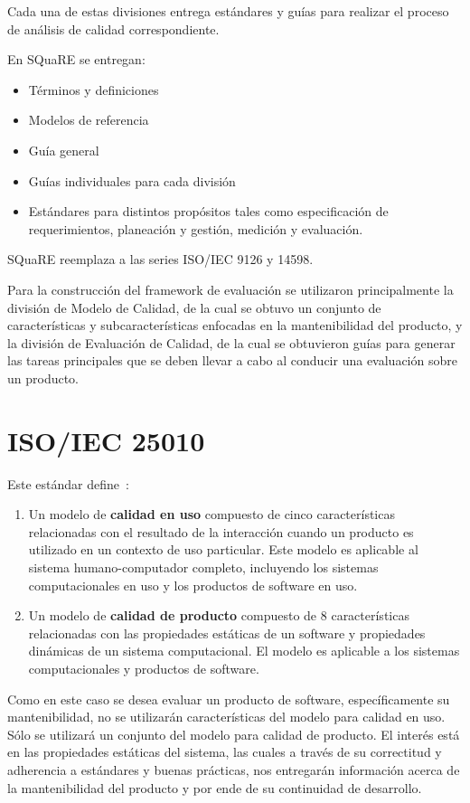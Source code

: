 Cada una de estas divisiones entrega estándares y guías para realizar
el proceso de análisis de calidad correspondiente.

En SQuaRE se entregan:
\begin{itemize}
    \item Términos y definiciones
    \item Modelos de referencia
    \item Guía general
    \item Guías individuales para cada división
    \item Estándares para distintos propósitos tales como especificación de requerimientos,
    planeación y gestión, medición y evaluación.
\end{itemize}

SQuaRE reemplaza a las series ISO/IEC 9126 y 14598.

Para la construcción del framework de evaluación se utilizaron
principalmente la división de Modelo de Calidad, de la cual
se obtuvo un conjunto de características  y subcaracterísticas enfocadas en la mantenibilidad del
producto, y la división de Evaluación de Calidad, de la cual se obtuvieron
guías para generar las tareas principales que se deben llevar a cabo al conducir una evaluación
sobre un producto.

\section{ISO/IEC 25010}

Este estándar define~\cite{25010}:

\begin{enumerate}
    \item Un modelo de \textbf{calidad en uso} compuesto de cinco características
    relacionadas con el resultado de la interacción cuando un producto es utilizado
    en un contexto de uso particular. Este modelo es aplicable al sistema
    humano-computador completo, incluyendo los sistemas computacionales en uso
    y los productos de software en uso.
    \item Un modelo de \textbf{calidad de producto} compuesto de 8 características relacionadas
    con las propiedades estáticas de un software y propiedades dinámicas de un sistema
    computacional. El modelo es aplicable a los sistemas computacionales y productos
    de software.
\end{enumerate}

Como en este caso se desea evaluar un producto de software, específicamente
su mantenibilidad, no se utilizarán características del modelo para calidad
en uso. Sólo se utilizará un conjunto del modelo para calidad de producto.
El interés está en las propiedades estáticas del sistema, las cuales
a través de su correctitud y adherencia a estándares y buenas prácticas, nos
entregarán información acerca de la mantenibilidad del producto y por ende
de su continuidad de desarrollo.


